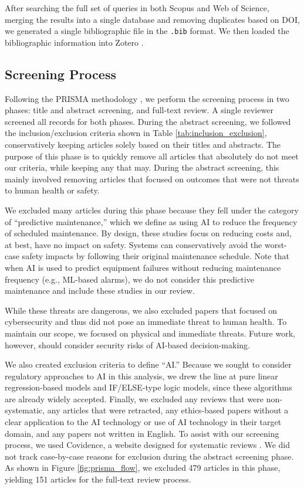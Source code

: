 \documentclass[authoryear,preprint,12pt]{elsarticle}
\begin{document}
After searching the full set of queries in both Scopus and Web of Science, merging the results into a single database
and removing duplicates based on DOI, we generated a single bibliographic file
in the \verb|.bib| format. We then loaded the bibliographic information into
Zotero \cite{zotero}. 


\subsection{Screening Process}
Following the PRISMA methodology \cite{pagePRISMA2020Statement2021}, we perform
the screening process in two phases: title and abstract screening, and full-text
review. A single reviewer screened all records for both phases. During the abstract screening, we followed the inclusion/exclusion
criteria shown in Table \ref{tab:inclusion_exclusion}, conservatively keeping
articles solely based on their titles and abstracts. The purpose of this phase
is to quickly remove all articles that absolutely do not meet our criteria,
while keeping any that may. During the abstract screening, this mainly involved
removing articles that focused on outcomes that were not threats to human health
or safety. 

We excluded many articles during this phase because they fell under the category
of ``predictive maintenance,'' which we define as using AI to reduce the
frequency of scheduled maintenance. By design, these studies focus on reducing
costs and, at best, have no impact on safety. Systems can conservatively avoid
the worst-case safety impacts by following their original maintenance schedule.
Note that when AI is used to predict equipment failures without reducing
maintenance frequency (e.g., ML-based alarms), we do not consider this
predictive maintenance and include these studies in our review. 

While these threats are dangerous, we also excluded papers that focused on
cybersecurity and thus did not pose an immediate threat to human health. To
maintain our scope, we focused on physical and immediate threats. Future work,
however, should consider security risks of AI-based decision-making.

We also created exclusion criteria to define ``AI.'' Because we sought to
consider regulatory approaches to AI in this analysis, we drew the line at pure
linear regression-based models and IF/ELSE-type logic models, since these
algorithms are already widely accepted. Finally, we excluded any reviews that
were non-systematic, any articles that were retracted, any ethics-based papers
without a clear application to the AI technology or use of AI technology in
their target domain, and any papers not written in English. To assist with our
screening process, we used Covidence, a website designed for systematic reviews
\cite{covidence}. We did not track case-by-case reasons for exclusion during the
abstract screening phase. As shown in Figure \ref{fig:prisma_flow}, we excluded
479 articles in this phase, yielding 151 articles for the full-text review
process.
\end{document}
